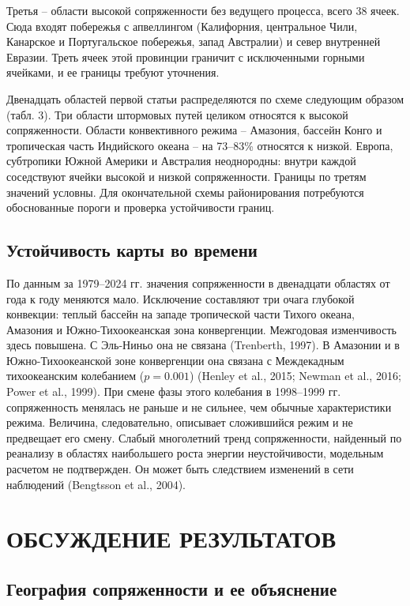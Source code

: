 \documentclass[12pt,a4paper]{article}
\begin{document}
Третья -- области высокой сопряженности без ведущего процесса, всего 38 ячеек. Сюда входят побережья с апвеллингом (Калифорния, центральное Чили, Канарское и Португальское побережья, запад Австралии) и север внутренней Евразии. Треть ячеек этой провинции граничит с исключенными горными ячейками, и ее границы требуют уточнения.

Двенадцать областей первой статьи распределяются по схеме следующим образом (табл. 3). Три области штормовых путей целиком относятся к высокой сопряженности. Области конвективного режима -- Амазония, бассейн Конго и тропическая часть Индийского океана -- на 73--83\% относятся к низкой. Европа, субтропики Южной Америки и Австралия неоднородны: внутри каждой соседствуют ячейки высокой и низкой сопряженности. Границы по третям значений условны. Для окончательной схемы районирования потребуются обоснованные пороги и проверка устойчивости границ.

\subsection{Устойчивость карты во времени}

По данным за 1979--2024 гг. значения сопряженности в двенадцати областях от года к году меняются мало. Исключение составляют три очага глубокой конвекции: теплый бассейн на западе тропической части Тихого океана, Амазония и Южно-Тихоокеанская зона конвергенции. Межгодовая изменчивость здесь повышена. С Эль-Ниньо она не связана (Trenberth, 1997). В Амазонии и в Южно-Тихоокеанской зоне конвергенции она связана с Междекадным тихоокеанским колебанием ($p = 0.001$) (Henley et al., 2015; Newman et al., 2016; Power et al., 1999). При смене фазы этого колебания в 1998--1999 гг. сопряженность менялась не раньше и не сильнее, чем обычные характеристики режима. Величина, следовательно, описывает сложившийся режим и не предвещает его смену. Слабый многолетний тренд сопряженности, найденный по реанализу в областях наибольшего роста энергии неустойчивости, модельным расчетом не подтвержден. Он может быть следствием изменений в сети наблюдений (Bengtsson et al., 2004).

\section{ОБСУЖДЕНИЕ РЕЗУЛЬТАТОВ}

\subsection{География сопряженности и ее объяснение}
\end{document}

